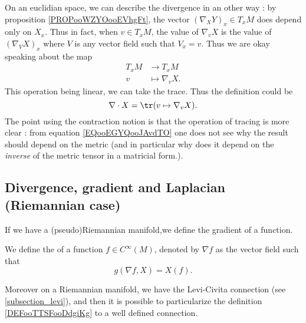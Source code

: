 On an euclidian space, we can describe the divergence in an other way : by proposition \ref{PROPooWZYOooEVhgFt}, the vector \( (\nabla_XY)_x\in T_xM \) does depend only on \( X_x\). Thus in fact, when \( v\in T_xM\), the value of \( \nabla_vX\) is the value of \( (\nabla_VX)_{x}\) where \( V\) is any vector field such that \( V_x=v\). Thus we are okay speaking about the map
\begin{equation}
    \begin{aligned}
         T_xM&\to T_xM \\
        v&\mapsto \nabla_vX. 
    \end{aligned}
\end{equation}
This operation being linear, we can take the trace. Thus the definition could be 
\begin{equation}    \label{EQooEGYQooJAvdTO}
    \nabla\cdot X=\tr(v\mapsto \nabla_vX).
\end{equation}
The point using the contraction notion is that the operation of tracing is more clear : from equation \eqref{EQooEGYQooJAvdTO} one does not see why the result should depend on the metric (and in particular why does it depend on the \emph{inverse} of the metric tensor in a matricial form.).

\subsection{Divergence, gradient and Laplacian (Riemannian case)}

If we have a (pseudo)Riemannian manifold,we define the gradient of a function.
\begin{definition}
    We define the  of a function $f\in C^{\infty}(M)$, denoted by $\nabla f$ as the vector field such that
    \begin{equation}        \label{EQooECZSooYfQFYm}
        g(\nabla f,X)=X(f).
    \end{equation}
\end{definition}

Moreover on a Riemannian manifold, we have the Levi-Civita connection (see \ref{subsection_levi}), and then it is possible to particularize the definition \ref{DEFooTTSFooDdgiKg} to a well defined connection.


